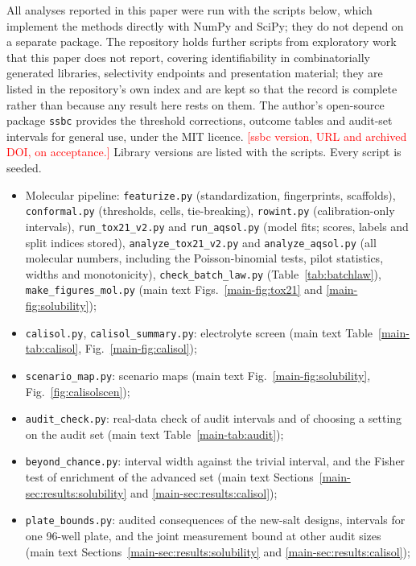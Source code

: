 \documentclass[10pt]{article}
\newcommand{\todo}[1]{\textcolor{red}{[#1]}}
\begin{document}
All analyses reported in this paper were run with the scripts below, which implement the methods directly with NumPy and SciPy; they do not depend on a separate package. The repository holds further scripts from exploratory work that this paper does not report, covering identifiability in combinatorially generated libraries, selectivity endpoints and presentation material; they are listed in the repository's own index and are kept so that the record is complete rather than because any result here rests on them. The author's open-source package \texttt{ssbc} provides the threshold corrections, outcome tables and audit-set intervals for general use, under the MIT licence. \todo{ssbc version, URL and archived DOI, on acceptance.} Library versions are listed with the scripts. Every script is seeded.
\begin{itemize}
\item Molecular pipeline: \texttt{featurize.py} (standardization, fingerprints, scaffolds), \texttt{conformal.py} (thresholds, cells, tie-breaking), \texttt{rowint.py} (calibration-only intervals), \texttt{run\_tox21\_v2.py} and \texttt{run\_aqsol.py} (model fits; scores, labels and split indices stored), \texttt{analyze\_tox21\_v2.py} and \texttt{analyze\_aqsol.py} (all molecular numbers, including the Poisson-binomial tests, pilot statistics, widths and monotonicity), \texttt{check\_batch\_law.py} (Table~\ref{tab:batchlaw}), \texttt{make\_figures\_mol.py} (main text Figs.~\ref{main-fig:tox21} and \ref{main-fig:solubility});
\item \texttt{calisol.py}, \texttt{calisol\_summary.py}: electrolyte screen (main text Table~\ref{main-tab:calisol}, Fig.~\ref{main-fig:calisol});
\item \texttt{scenario\_map.py}: scenario maps (main text Fig.~\ref{main-fig:solubility}, Fig.~\ref{fig:calisolscen});
\item \texttt{audit\_check.py}: real-data check of audit intervals and of choosing a setting on the audit set (main text Table~\ref{main-tab:audit});
\item \texttt{beyond\_chance.py}: interval width against the trivial interval, and the Fisher test of enrichment of the advanced set (main text Sections~\ref{main-sec:results:solubility} and \ref{main-sec:results:calisol});
\item \texttt{plate\_bounds.py}: audited consequences of the new-salt designs, intervals for one 96-well plate, and the joint measurement bound at other audit sizes (main text Sections~\ref{main-sec:results:solubility} and \ref{main-sec:results:calisol});

\end{itemize}
\end{document}
